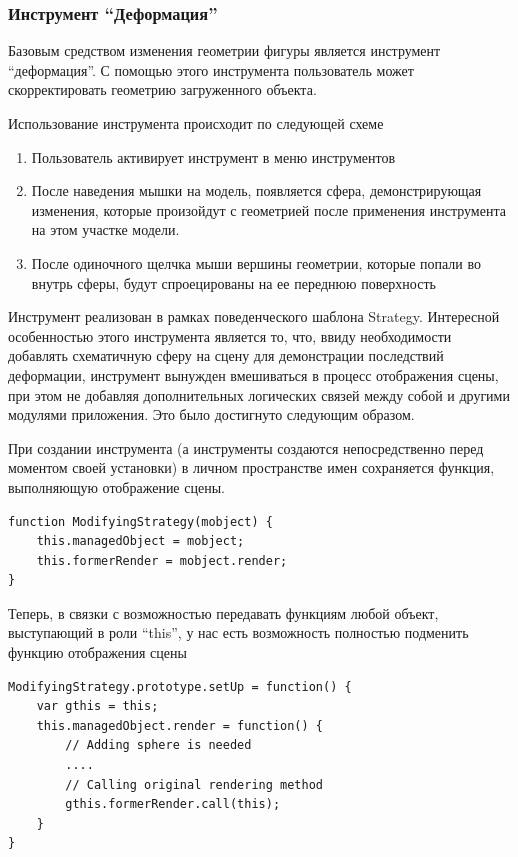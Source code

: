 \documentclass[12pt, a4paper]{article}
\begin{document}
\subsubsection{Инструмент ``Деформация''}

Базовым средством изменения геометрии фигуры является инструмент ``деформация''.
С помощью этого инструмента пользователь может скорректировать геометрию
загруженного объекта.

Использование инструмента происходит по следующей схеме

\begin{enumerate}
    \item Пользователь активирует инструмент в меню инструментов
    \item После наведения мышки на модель, появляется сфера, демонстрирующая
    изменения, которые произойдут с геометрией после применения инструмента на
    этом участке модели.
    \item После одиночного щелчка мыши вершины геометрии, которые попали во
    внутрь сферы, будут спроецированы на ее переднюю поверхность
\end{enumerate}

Инструмент реализован в рамках поведенческого шаблона Strategy. Интересной
особенностью этого инструмента является то, что, ввиду необходимости добавлять
схематичную сферу на сцену для демонстрации последствий деформации, инструмент
вынужден вмешиваться в процесс отображения сцены, при этом не добавляя
дополнительных логических связей между собой и другими модулями приложения. Это
было достигнуто следующим образом.

При создании инструмента (а инструменты создаются непосредственно перед моментом
своей установки) в личном пространстве имен сохраняется функция,
выполняющую отображение сцены.

\begin{lstlisting}
function ModifyingStrategy(mobject) {
    this.managedObject = mobject;
    this.formerRender = mobject.render;
}
\end{lstlisting}

Теперь, в связки с возможностью передавать функциям любой объект,
выступающий в роли ``this'', у нас есть возможность полностью подменить функцию
отображения сцены

\begin{lstlisting}
ModifyingStrategy.prototype.setUp = function() {
    var gthis = this;
    this.managedObject.render = function() {
        // Adding sphere is needed
        ....
        // Calling original rendering method
        gthis.formerRender.call(this);
    }
}
\end{lstlisting}
\end{document}
